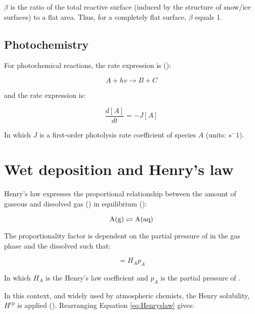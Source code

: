 \medskip

$\beta$ is the ratio of the total reactive surface (induced by the structure of snow/ice surfaces) to a flat area. Thus, for a completely flat surface, $\beta$ equals 1. 





\subsection{Photochemistry}

For photochemical reactions, the rate expression is (\cite{AtmModFund}):

\begin{equation*}
    A + hv \rightarrow B + C
\end{equation*}

and the rate expression is: 

\begin{equation*}
    \frac{d[A]}{dt} = -J[A]
\end{equation*}

In which $J$ is a first-order photolysis rate coefficient of species $A$ (units: $s^-1$). 

\section{Wet deposition and Henry's law}\label{sec:wet_dep_henrys_law}

Henry's law expresses the proportional relationship between the amount of gaseous and dissolved gas () in equilibrium (\cite{SeinfeldSpyros}): 

\begin{equation*}
    \mathrm{A(g)} \rightleftharpoons \mathrm{A(aq)}
\end{equation*}

The proportionality factor is dependent on the partial pressure of  in the gas phase and the dissolved  such that: 

\begin{equation}
    [\chem{A(aq)}] = H_Ap_A
    \label{eq:Henryslaw}
\end{equation}

In which $H_A$ is the Henry's law coefficient and $p_A$ is the partial pressure of . 

\medskip

In this context, and widely used by atmospheric chemists, the Henry solubility, $H^{cp}$ is applied (\cite{Sander2015}). Rearranging Equation \ref{eq:Henryslaw} gives: 

